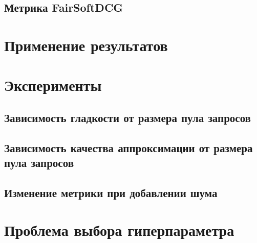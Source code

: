 \documentclass[12pt,a4paper]{amsart}
\theoremstyle{definition}
\theoremstyle{definition}
\begin{document}

\subsection{Метрика FairSoftDCG}
\pagebreak


\newpage
\section{Применение результатов}


\newpage
\section{Эксперименты}

\subsection{Зависимость гладкости от размера пула запросов}
\pagebreak


\subsection{Зависимость качества аппроксимации от размера пула запросов}
\pagebreak


\subsection{Изменение метрики при добавлении шума}
\pagebreak


\newpage
\section{Проблема выбора гиперпараметра}
\end{document}
